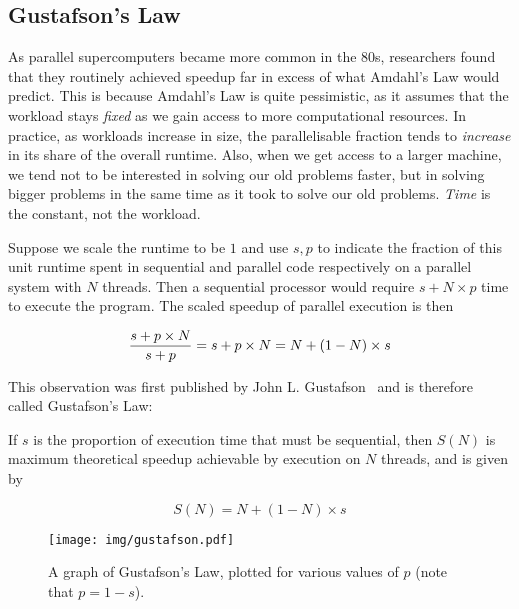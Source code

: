 \subsection{Gustafson's Law}
\label{sec:gustafson}

As parallel supercomputers became more common in the 80s, researchers
found that they routinely achieved speedup far in excess of what
Amdahl's Law would predict.  This is because Amdahl's Law is quite
pessimistic, as it assumes that the workload stays \emph{fixed} as we
gain access to more computational resources.  In practice, as
workloads increase in size, the parallelisable fraction tends to
\emph{increase} in its share of the overall runtime.  Also, when we
get access to a larger machine, we tend not to be interested in
solving our old problems faster, but in solving bigger problems in the
same time as it took to solve our old problems.  \emph{Time} is the
constant, not the workload.

Suppose we scale the runtime to be $1$ and use $s,p$ to indicate the
fraction of this unit runtime spent in sequential and parallel code
respectively on a parallel system with $N$ threads.  Then a sequential
processor would require $s+N\times{}p$ time to execute the program.
The scaled speedup of parallel execution is then

\begin{equation*}
  \frac{s+p\times N}{s+p} \\
  = s+p\times N \\
  = N + (1-N) \times s
\end{equation*}

This observation was first published by John
L. Gustafson~\cite{10.1145/42411.42415} and is therefore called
Gustafson's Law:

\begin{definition}\label{gustafson}
  If $s$ is the proportion of execution time that must be sequential,
  then $S(N)$ is maximum theoretical speedup achievable by execution
  on $N$ threads, and is given by

  \[
    S(N) = N + (1-N) \times s
  \]
\end{definition}

\begin{figure}
  \centering
  \texttt{[image: img/gustafson.pdf]}
  \caption{A graph of Gustafson's Law, plotted for various values of
    $p$ (note that $p=1-s$).}
  \label{fig:gustafson}
\end{figure}

